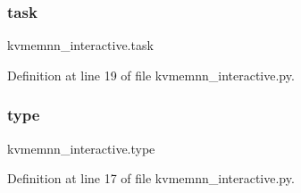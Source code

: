 \subsubsection{\texorpdfstring{task}{task}}
{\footnotesize\ttfamily kvmemnn\+\_\+interactive.\+task}



Definition at line 19 of file kvmemnn\+\_\+interactive.\+py.

\mbox{\label{namespacekvmemnn__interactive_aa840d8e8b6d26c2c214c86c5d290bbfa}} 
\subsubsection{\texorpdfstring{type}{type}}
{\footnotesize\ttfamily kvmemnn\+\_\+interactive.\+type}



Definition at line 17 of file kvmemnn\+\_\+interactive.\+py.

